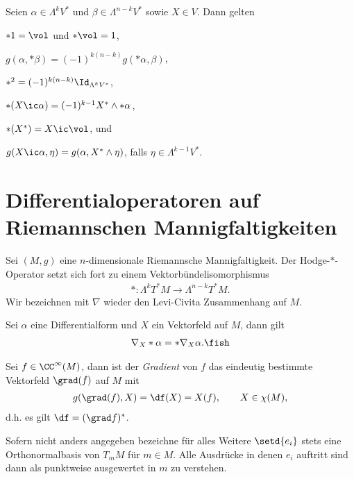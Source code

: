 \documentclass[%
	paper=a5,%
	fleqn,%
	DIV=18,%
	BCOR=0mm,
	fontsize=11pt,
	titlepage=false,%
	bibliography=totoc,
	DIV=18,%
	twoside=true,
	pdftitle=Riemannsche Geometrie,
	pdfauthor=Uwe Semmelmann,
	numbers=noendperiod]%
	{scrbook}
\begin{document}
\begin{lem}
Seien $\alpha\in\Lambda^k V^*$ und $\beta\in \Lambda^{n-k}V^*$ sowie $X\in V$. Dann gelten
\begin{propenum}
\item $*1 = \vol$ und $*\vol = 1$,
\item $g(\alpha,*\beta) = (-1)^{k(n-k)}g(*\alpha,\beta)$,
\item $*^2 = (-1)^{k(n-k)}\Id_{\Lambda^kV^*}$,
\item $*(X\ic \alpha) = (-1)^{k-1}X^*\wedge *\alpha$,
\item $*(X^*) = X\ic \vol$, und
\item $g(X\ic \alpha,\eta) = g(\alpha, X^*\wedge \eta)$, falls $\eta\in \Lambda^{k-1}V^*$.\fish
\end{propenum}
\end{lem}

\section{Differentialoperatoren auf Riemannschen Mannigfaltigkeiten}

Sei $(M,g)$ eine $n$-dimensionale Riemannsche Mannigfaltigkeit. Der Hodge-$*$-Operator setzt sich fort zu einem Vektorbündelisomorphismus
\begin{align*}
* : \Lambda^k T^*M\to \Lambda^{n-k}T^*M.
\end{align*}
Wir bezeichnen mit $\nabla$ wieder den Levi-Civita Zusammenhang auf $M$.

\begin{lem}
Sei $\alpha$ eine Differentialform und $X$ ein Vektorfeld auf $M$, dann gilt
\begin{align*}
\nabla_{X}*\alpha = * \nabla_{X}\alpha.\fish
\end{align*}
\end{lem}

\begin{defn}
Sei $f\in\CC^\infty(M)$, dann ist der \emph{Gradient} von $f$ das eindeutig bestimmte Vektorfeld $\grad(f)$ auf $M$ mit
\begin{align*}
g(\grad(f),X) = \df(X) = X(f),\qquad X\in\chi(M),
\end{align*}
d.h. es gilt $\df = (\grad f)^*$.\fish
\end{defn}

\begin{rem}[Vereinbarung.]
Sofern nicht anders angegeben bezeichne für alles Weitere $\setd{e_{i}}$ stets eine Orthonormalbasis von $T_{m}M$ für $m\in M$. Alle Ausdrücke in denen $e_{i}$ auftritt sind dann als punktweise ausgewertet in $m$ zu verstehen.\map
\end{rem}
\end{document}

